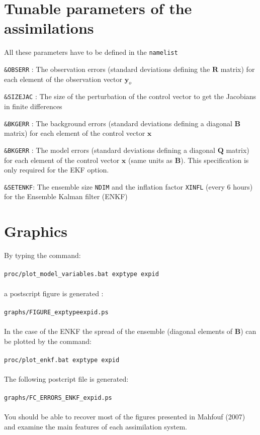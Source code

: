 \documentclass[12pt]{article}
\begin{document}
\section{Tunable parameters of the assimilations}
All these parameters have to be defined in the {\tt namelist}
\begin{description}
\item {\tt \&OBSERR} : The observation errors (standard deviations defining the
 $\mathbf{R}$ matrix) for each element of the observation vector $\mathbf{y}_o$
\item {\tt \&SIZEJAC} : The size of the perturbation of the control vector to get the Jacobians
in finite differences 
\item {\tt \&BKGERR} : The background errors (standard deviations defining a
diagonal $\mathbf{B}$ matrix) for each element of the control vector
$\mathbf{x}$  
\item {\tt \&BKGERR} : The model errors (standard deviations defining
a diagonal $\mathbf{Q}$ matrix) for each element of the control
vector $\mathbf{x}$ (same units as $\mathbf{B}$). This specification
is only required for the EKF option.
\item {\tt \&SETENKF}: The ensemble size {\tt NDIM} and the inflation factor {\tt XINFL}
(every 6 hours) for the Ensemble Kalman filter (ENKF)
\end{description}
\section{Graphics}
By typing the command:
\\
\\
{\tt proc/plot\_model\_variables.bat exptype expid}
\\
\\
a postscript figure is generated :
\\
\\
{\tt graphs/FIGURE\_exptypeexpid.ps}
\\
\\
In the case of the ENKF the spread of the ensemble (diagonal elements of $\mathbf{B}$)
can be plotted by the command:
\\
\\
{\tt proc/plot\_enkf.bat exptype expid}
\\
\\
The following postcript file is generated:
\\
\\
{\tt graphs/FC\_ERRORS\_ENKF\_expid.ps}
\\
\\
You should be able to recover most of the figures presented in Mahfouf (2007) and 
examine the main features of each assimilation system.
\end{document}
